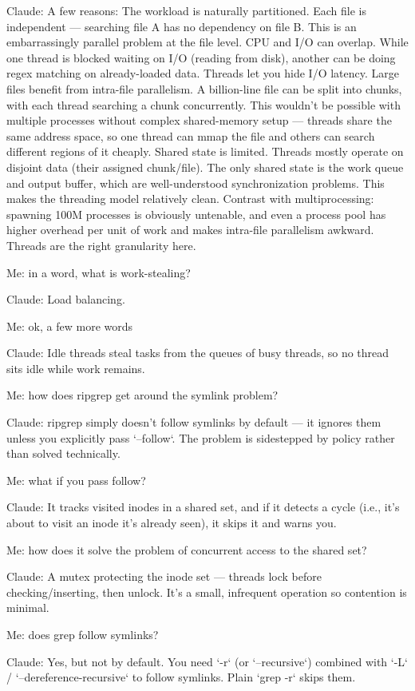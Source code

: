 \documentclass[letterpaper,twocolumn,10pt]{article}
\begin{document}
Claude: A few reasons:
The workload is naturally partitioned. Each file is independent --- searching file A has no dependency on file B. This is an embarrassingly parallel problem at the file level.
CPU and I/O can overlap. While one thread is blocked waiting on I/O (reading from disk), another can be doing regex matching on already-loaded data. Threads let you hide I/O latency.
Large files benefit from intra-file parallelism. A billion-line file can be split into chunks, with each thread searching a chunk concurrently. This wouldn't be possible with multiple processes without complex shared-memory setup --- threads share the same address space, so one thread can mmap the file and others can search different regions of it cheaply.
Shared state is limited. Threads mostly operate on disjoint data (their assigned chunk/file). The only shared state is the work queue and output buffer, which are well-understood synchronization problems. This makes the threading model relatively clean.
Contrast with multiprocessing: spawning 100M processes is obviously untenable, and even a process pool has higher overhead per unit of work and makes intra-file parallelism awkward. Threads are the right granularity here.

Me: in a word, what is work-stealing?

Claude: Load balancing.

Me: ok, a few more words

Claude: Idle threads steal tasks from the queues of busy threads, so no thread sits idle while work remains.

Me: how does ripgrep get around the symlink problem?

Claude: ripgrep simply doesn't follow symlinks by default --- it ignores them unless you explicitly pass `--follow`. The problem is sidestepped by policy rather than solved technically.

Me: what if you pass follow?

Claude: It tracks visited inodes in a shared set, and if it detects a cycle (i.e., it's about to visit an inode it's already seen), it skips it and warns you.

Me: how does it solve the problem of concurrent access to the shared set?

Claude: A mutex protecting the inode set --- threads lock before checking/inserting, then unlock. It's a small, infrequent operation so contention is minimal.

Me: does grep follow symlinks?

Claude: Yes, but not by default. You need `-r` (or `--recursive`) combined with `-L` / `--dereference-recursive` to follow symlinks. Plain `grep -r` skips them.
\end{document}
